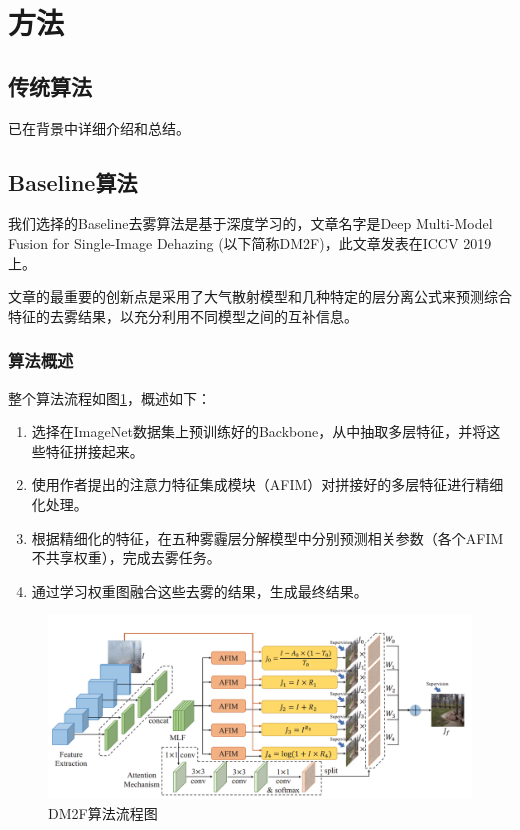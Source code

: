 \documentclass{article}
\begin{document}
\section{方法}
\subsection{传统算法}
已在背景中详细介绍和总结。

\subsection{Baseline算法}
我们选择的Baseline去雾算法是基于深度学习的，文章名字是Deep Multi-Model Fusion for Single-Image Dehazing\cite{deng2019deep} (以下简称DM2F)，此文章发表在ICCV 2019上。

文章的最重要的创新点是采用了大气散射模型和几种特定的层分离公式来预测综合特征的去雾结果，以充分利用不同模型之间的互补信息。

\subsubsection{算法概述}

整个算法流程如图\ref{fig:fig2}，概述如下：
\begin{enumerate}
  \item 选择在ImageNet\cite{krizhevsky2012imagenet}数据集上预训练好的Backbone，从中抽取多层特征，并将这些特征拼接起来。
  \item 使用作者提出的注意力特征集成模块（AFIM）对拼接好的多层特征进行精细化处理。
  \item 根据精细化的特征，在五种雾霾层分解模型中分别预测相关参数（各个AFIM不共享权重），完成去雾任务。
  \item 通过学习权重图融合这些去雾的结果，生成最终结果。
\end{enumerate}

\begin{figure}[t]
  \centering
  \includegraphics[width=.9\linewidth]{image/baseline_pip.png}
  \caption{DM2F算法流程图}
  \label{fig:fig2}
\end{figure}
\end{document}
